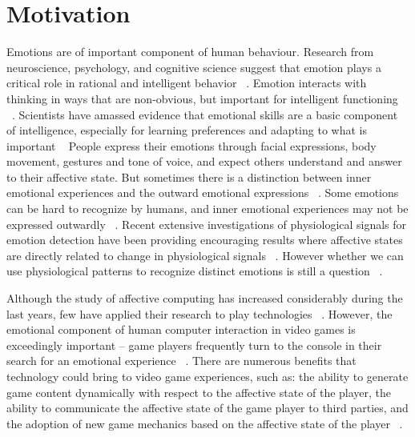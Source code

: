 \section{Motivation}
Emotions are of important component of human behaviour. Research from neuroscience, psychology, and cognitive science suggest that emotion plays a critical role in rational and intelligent behavior ~\cite{picard2001toward}. Emotion interacts with thinking in ways that are non-obvious, but important for intelligent functioning ~\cite{picard2001toward}. Scientists have amassed evidence that emotional skills are a basic component of intelligence, especially for learning preferences and adapting to what is important ~\cite{mayer1993intelligence, goleman2006emotional} People express their emotions through facial expressions, body movement, gestures and tone of voice, and expect others understand and answer to their affective state. But sometimes there is a distinction between inner emotional experiences and the outward emotional expressions ~\cite{picard2003affective}. Some emotions can be hard to recognize by humans, and inner emotional experiences may not be expressed outwardly ~\cite{jones2007biometric}. Recent extensive investigations of physiological signals for emotion detection have been providing encouraging results where affective states are directly related to change in physiological signals ~\cite{jones2007biometric}. However whether we can use physiological patterns to recognize distinct emotions is still a question ~\cite{picard2001toward, cacioppo1990inferring}.

Although the study of affective computing has increased considerably during the last years, few have applied their research to play technologies ~\cite{sykes2003affective}. However, the emotional component of human computer interaction in video games is exceedingly important – game players frequently turn to the console in their search for an emotional experience ~\cite{rouse2010game}. There are numerous benefits that technology could bring to video game experiences, such as: the ability to generate game content dynamically with respect to the affective state of the player, the ability to communicate the affective state of the game player to third parties, and the adoption of new game mechanics based on the affective state of the player ~\cite{sykes2003affective}.

